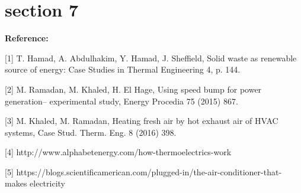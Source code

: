\documentclass[12pt]{beamer}
\begin{document}
\section{section 7}
\begin{frame}
\textbf{Reference:         }


[1]	T. Hamad, A. Abdulhakim, Y. Hamad, J. Sheffield, Solid waste as renewable source of energy:  Case Studies in Thermal Engineering 4, p. 144. 
 
 
[2]	M. Ramadan, M. Khaled, H. El Hage, Using speed bump for power generation– experimental study, Energy Procedia 75 (2015) 867. 
 
 
[3]	M. Khaled, M. Ramadan, Heating fresh air by hot exhaust air of HVAC systems, Case Stud. Therm.  Eng. 8 (2016) 398. 
 
 
[4]	http://www.alphabetenergy.com/how-thermoelectrics-work 
 
 
[5]	https://blogs.scientificamerican.com/plugged-in/the-air-conditioner-that-makes electricity 



\end{frame}
\end{document}
